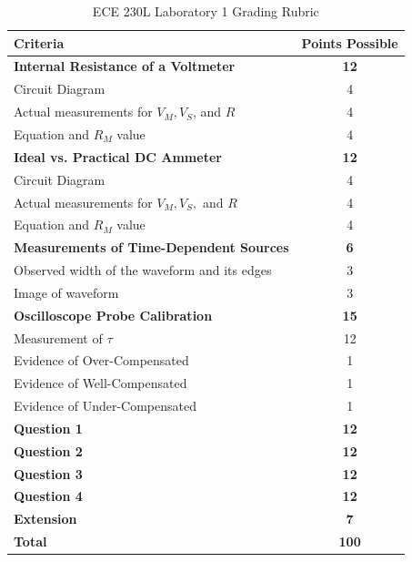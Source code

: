 \documentclass[12pt]{../manual}
\begin{document}
%
\newpage
{}
{}
\hspace{0pt}
\vfill
\begin{table}[ht!]
\caption{ECE 230L Laboratory 1 Grading Rubric}
\centering
\begin{tabular}{l|c} \hline
Criteria & Points Possible \\ \hline \hline
\textbf{Internal Resistance of a Voltmeter}					& \textbf{12} \\
Circuit Diagram												& 4 \\
Actual measurements for $V_M, V_S$, and $R$					& 4 \\
Equation and $R_M$ value									& 4 \\ \hline
\textbf{Ideal vs. Practical DC Ammeter}						& \textbf{12} \\
Circuit Diagram												& 4 \\
Actual measurements for $V_M, V_S,$ and $R$					& 4 \\
Equation and $R_M$ value									& 4 \\ \hline
\textbf{Measurements of Time-Dependent Sources}				& \textbf{6} \\
Observed width of the waveform and its edges				& 3 \\
Image of waveform 											& 3 \\ \hline
\textbf{Oscilloscope Probe Calibration}						& \textbf{15} \\
Measurement of $\tau$										& 12 \\
Evidence of Over-Compensated								& 1 \\
Evidence of Well-Compensated								& 1 \\
Evidence of Under-Compensated								& 1 \\ \hline
\textbf{Question 1}											& \textbf{12} \\ \hline
\textbf{Question 2}											& \textbf{12} \\ \hline
\textbf{Question 3}											& \textbf{12} \\ \hline
\textbf{Question 4}											& \textbf{12} \\ \hline
\textbf{Extension}											& \textbf{7} \\ \hline
\textbf{Total}												& \textbf{100} \\ \hline
\end{tabular}
\end{table}
\vfill
\hspace{0pt}
%
\end{document}
